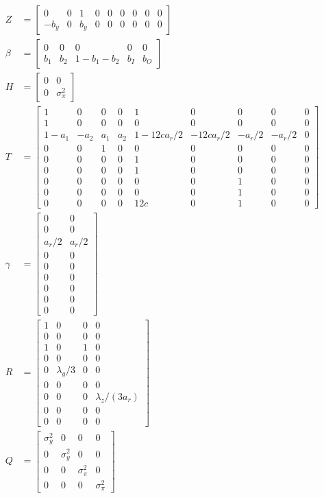 \documentclass{article}
\begin{document}
\begin{align*}
Z &= \begin{bmatrix} 0 & 0 & 1 & 0 & 0 & 0 & 0 & 0 & 0 \\ -b_y & 0 & b_y & 0 & 0 & 0 & 0 & 0 & 0 \end{bmatrix} \\
\beta &= \begin{bmatrix} 0 & 0 & 0 & 0 & 0 \\ b_1 & b_2 & 1-b_1-b_2 & b_I & b_O \end{bmatrix} \\
H &= \begin{bmatrix} 0 & 0 \\ 0 & \sigma_\pi^2 \end{bmatrix}  \\
T &= \begin{bmatrix} 
  1 & 0 & 0 & 0 & 1 & 0 & 0 & 0 & 0 \\ 
  1 & 0 & 0 & 0 & 0 & 0 & 0 & 0 & 0 \\ 
  1-a_1 & -a_2 & a_1 & a_2 & 1-12 c  a_r / 2 & -12 c a_r / 2 & -a_r / 2 & -a_r / 2 & 0 \\
  0 & 0 & 1 & 0 & 0 & 0 & 0 & 0 & 0 \\ 
  0 & 0 & 0 & 0 & 1 & 0 & 0 & 0 & 0 \\ 
  0 & 0 & 0 & 0 & 1 & 0 & 0 & 0 & 0 \\ 
  0 & 0 & 0 & 0 & 0 & 0 & 1 & 0 & 0 \\ 
  0 & 0 & 0 & 0 & 0 & 0 & 1 & 0 & 0 \\ 
  0 & 0 & 0 & 0 & 12c & 0 & 1 & 0 & 0 \end{bmatrix} \\
\gamma &= \begin{bmatrix} 0 & 0 \\ 0 & 0 \\ a_r/2 & a_r/2 \\ 0 & 0 \\ 0 & 0 \\ 0 & 0 \\ 0 & 0 \\ 0 & 0 \\ 0 & 0 \end{bmatrix} \\
R &= \begin{bmatrix} 1 & 0 & 0 & 0 \\ 0 & 0 & 0 & 0 \\ 1 & 0 & 1 & 0 \\ 0 & 0 & 0 & 0 \\ 
  0 & \lambda_g/3 & 0 & 0 \\ 0 & 0 & 0 & 0 \\ 
  0 & 0 & 0 & \lambda_z/(3a_r) \\ 0 & 0 & 0 & 0 \\ 0 & 0 & 0 & 0 \end{bmatrix} \\
Q &= \begin{bmatrix} \sigma_y^2 & 0 & 0 & 0 \\ 0 & \sigma_y^2 & 0 & 0 \\ 0 & 0 & \sigma_\pi^2 & 0 \\ 0 & 0 & 0 & \sigma_\pi^2 \end{bmatrix}
\end{align*} 
\end{document}
